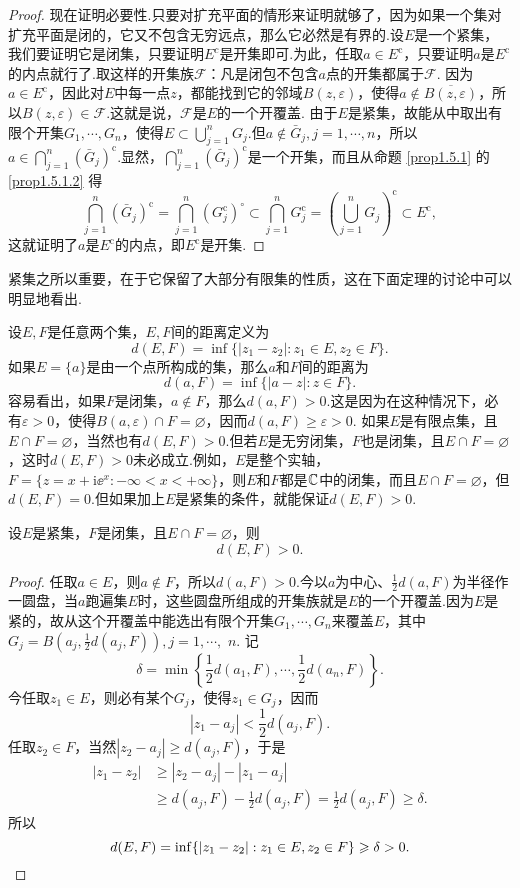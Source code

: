 \begin{proof}
  现在证明必要性.只要对扩充平面的情形来证明就够了，因为如果一个集对扩充平面是闭的，它又不包含无穷远点，那么它必然是有界的.设$E$是一个紧集，我们要证明它是闭集，只要证明$E^c$是开集即可.为此，任取$a\in E^{\mathrm c}$，只要证明$a$是$E^{\mathrm c}$的内点就行了.取这样的开集族$\mathscr F$：凡是闭包不包含$a$点的开集都属于$\mathscr F$. 因为$a\in E^{\mathrm c}$，因此对$E$中每一点$z$，都能找到它的邻域$B(z,\varepsilon)$，使得$a\notin \overline{B(z,\varepsilon)}$，所以$B(z,\varepsilon)\in\mathscr F$.这就是说，$\mathscr F$是$E$的一个开覆盖. 由于$E$是紧集，故能从中取出有限个开集$G_1,\cdots,G_n$，使得$E\subset\bigcup_{j=1}^nG_j$.但$a\notin \bar G_j,j=1,\cdots,n$，所以$a\in\bigcap_{j=1}^n(\bar G_j)^{\mathrm c}$.显然，$\bigcap_{j=1}^n(\bar G_j)^{\mathrm c}$是一个开集，而且从命题 \ref{prop1.5.1} 的 \ref{prop1.5.1.2} 得
  \[
    \bigcap_{j=1}^n(\bar G_j)^{\mathrm c} = \bigcap_{j=1}^n(G_j^{\mathrm c})^\circ \subset\bigcap_{j=1}^n G_j^{\mathrm c} = \left(\bigcup_{j=1}^nG_j\right)^{\mathrm c}\subset E^{\mathrm c},
  \]
  这就证明了$a$是$E^{\mathrm c}$的内点，即$E^{\mathrm c}$是开集.
\end{proof}

紧集之所以重要，在于它保留了大部分有限集的性质，这在下面定理的讨论中可以明显地看出.

设$E,F$是任意两个集，$E,F$间的距离定义为
\[
  d(E,F) = \inf \{|z_1-z_2|: z_1\in E,z_2 \in F\}.
\]
如果$E=\{a\}$是由一个点所构成的集，那么$a$和$F$间的距离为
\[
  d(a,F) = \inf \{|a-z|:z\in F\}.
\]
容易看出，如果$F$是闭集，$a\notin F$，那么$d(a,F)>0$.这是因为在这种情况下，必有$\varepsilon>0$，使得$B(a,\varepsilon)\cap F=\varnothing$，因而$d(a,F)\ge\varepsilon>0$.
如果$E$是有限点集，且$E\cap F=\varnothing$，当然也有$d(E,F)>0$.但若$E$是无穷闭集，$F$也是闭集，且$E\cap F=\varnothing$，这时$d(E,F)>0$未必成立.例如，$E$是整个实轴，$F=\{z=x+\mathrm i\ee^x:-\infty<x<+\infty\}$，则$E$和$F$都是$\MC$中的闭集，而且$E\cap F=\varnothing$，但$d(E,F)=0$.但如果加上$E$是紧集的条件，就能保证$d(E,F)>0$.

\begin{theorem}\label{thm1.5.6}
  设$E$是紧集，$F$是闭集，且$E\cap F=\varnothing$，则
  \[
    d(E,F)>0.
  \]
\end{theorem}
\begin{proof}
  任取$a\in E$，则$a\notin F$，所以$d(a,F)>0$.今以$a$为中心、$\frac12d(a,F)$为半径作一圆盘，当$a$跑遍集$E$时，这些圆盘所组成的开集族就是$E$的一个开覆盖.因为$E$是紧的，故从这个开覆盖中能选出有限个开集$G_1,\cdots,G_n$来覆盖$E$，其中$G_j=B\left(a_j,\frac12d(a_j,F)\right),j=1,\cdots,$ $n$. 记
  \[
    \delta = \min\left\{\frac12d(a_1,F),\cdots,\frac12d(a_n,F)\right\}.
  \]
  今任取$z_1\in E$，则必有某个$G_j$，使得$z_1\in G_j$，因而
  \[
    |z_1 - a_j| < \frac12 d(a_j,F).
  \]
  任取$z_2\in F$，当然$|z_2-a_j|\ge d(a_j,F)$，于是
  \begin{align*}
    |z_1-z_2| & \ge |z_2-a_j|-|z_1-a_j|\\
              & \ge d(a_j,F)-\frac12d(a_j,F) = \frac12d(a_j,F)\ge\delta.
  \end{align*}
  所以
  \[
    d(E,F) = \inf \{|z_1-z_2|:z_1\in E,z_2\in F\} \ge \delta > 0. \qedhere
  \]
\end{proof}

